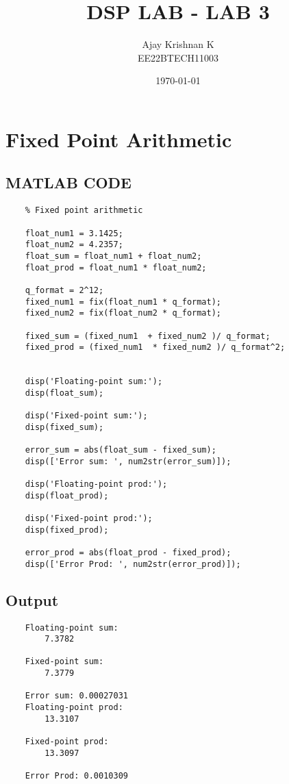 \documentclass[a4paper,12pt]{article}
\title{\textbf{DSP LAB - LAB 3}}
\author{Ajay Krishnan K \\ EE22BTECH11003}
\date{\today}
\begin{document}
\maketitle

\section{Fixed Point Arithmetic}

\subsection{MATLAB CODE}

\begin{lstlisting}
    % Fixed point arithmetic

    float_num1 = 3.1425;
    float_num2 = 4.2357;
    float_sum = float_num1 + float_num2;
    float_prod = float_num1 * float_num2;

    q_format = 2^12;
    fixed_num1 = fix(float_num1 * q_format);
    fixed_num2 = fix(float_num2 * q_format);

    fixed_sum = (fixed_num1  + fixed_num2 )/ q_format;
    fixed_prod = (fixed_num1  * fixed_num2 )/ q_format^2;


    disp('Floating-point sum:');
    disp(float_sum);

    disp('Fixed-point sum:');
    disp(fixed_sum);

    error_sum = abs(float_sum - fixed_sum);
    disp(['Error sum: ', num2str(error_sum)]);  

    disp('Floating-point prod:');
    disp(float_prod);

    disp('Fixed-point prod:');
    disp(fixed_prod);

    error_prod = abs(float_prod - fixed_prod);
    disp(['Error Prod: ', num2str(error_prod)]);

\end{lstlisting}

\subsection{Output}

\begin{lstlisting}
    Floating-point sum:
        7.3782

    Fixed-point sum:
        7.3779

    Error sum: 0.00027031
    Floating-point prod:
        13.3107

    Fixed-point prod:
        13.3097

    Error Prod: 0.0010309
\end{lstlisting}
\end{document}
